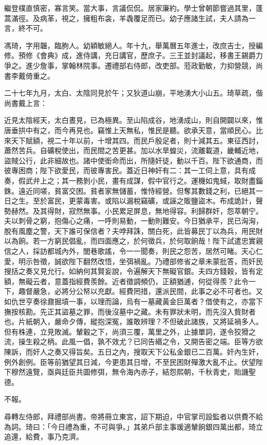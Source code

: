 \begin{pinyinscope}
{繼登樸直慎密，寡言笑。當大事，言議侃侃。居家廉約。學士曾朝節嘗過其里，蓬蒿滿徑。及病革，視之，擁粗布衾，羊毳覆足而已。幼子應諸生試，夫人請為一言，終不可。

馮琦，字用韞，臨朐人。幼穎敏絕人。年十九，舉萬曆五年進士，改庶吉士，授編修。預修《會典》成，進侍講，充日講官，歷庶子。三王並封議起，移書王錫爵力爭之。進少詹事，掌翰林院事。遷禮部右侍郎，改吏部。蒞政勤敏，力抑營競，尚書李戴倚重之。

二十七年九月，太白、太陰同見於午；又狄道山崩，平地湧大小山五。琦草疏，偕尚書戴上言：

近見太陰經天，太白晝見，已為極異。至山陷成谷，地湧成山，則自開闢以來，惟唐垂拱中有之，而今再見也。竊惟上天無私，惟民是聽。欲承天意，當順民心。比來天下賦額，視二十年以前，十增其四。而民戶殷足者，則十減其五。東征西討，蕭然苦兵。自礦稅使出，而民間之苦更甚。加以水旱蝗災，流離載道，畿輔近地，盜賊公行，此非細故也。諸中使銜命而出，所隨奸徒，動以千百。陛下欲通商，而彼專困商；陛下欲愛民，而彼專害民。蓋近日神奸有二：其一工伺上意，具有成奏，假武弁上之；其一務剝小民，畫有成謀，假中官行之。運機如鬼蜮，取財盡錙銖。遠近同嗟，貧富交困。貧者家無儲蓄，惟恃經營。但奪其數錢之利，已絕其一日之生。至於富民，更蒙毒害。或陷以漏稅竊礦，或誣之販鹽盜木。布成詭計，聲勢赫然。及其得財，寂然無事。小民累足屏息，無地得容。利歸群奸，怨萃朝宁。夫以刺骨之窮，抱傷心之痛，一呼則易動，一動則難安。今日猶承平，民已洶洶，脫有風塵之警，天下誰可保信者？夫哱拜誅，關白死，此皆募民丁以為兵，用民財以為餉。若一方窮民倡亂，而四面應之，於何徵兵，於何取餉哉！陛下試遣忠實親信之人，採訪都城內外，閭巷歌謠，令一一聞奏，則民之怨苦，居然可睹。天心仁愛，明示咎徵，誠欲陛下翻然改悟，坐弭禍亂。乃禮部修省之章未蒙批答，而奸民搜括之奏又見允行。如納何其賢妄說，令遍解天下無礙官銀。夫四方錢穀，皆有定額，無礙云者，意蓋指經費羨餘。近者徵調頻仍，正額猶逋，何從得羨？此令一下，趣督嚴急，必將分公帑以充獻。經費罔措，還派民間，此事之必不可者也。又如仇世亨奏徐鼐掘墳一事，以理而論，烏有一墓藏黃金巨萬者？借使有之，亦當下撫按核勘。先正其盜墓之罪，而後沒墓中之藏。未有罪狀未明，而先沒入貲財者也。片紙朝入，嚴命夕傳，縱抱深冤，誰敢辨理？不但破此諸族，又將延禍多人。但有株連，立見敗滅。輦轂之下，尚須三覆，萬里之外，止據單詞，遂令狡猾之流，操生殺之柄。此風一倡，孰不效尤？已同告緡之令，又開告密之端。臣等方欲陳訴，而奸人之奏又得旨矣。五日之內，搜取天下公私金銀已二百萬。奸內生奸，例外創例。臣等前猶望其日減，今更患其日增，不至民困財殫激大亂不止。伏望陛下穆然遠覽，亟與廷臣共圖修弭，無令海內赤子，結怨熙朝，千秋青史，貽譏聖德。

不報。

尋轉左侍郎，拜禮部尚書。帝將冊立東宮，詔下期迫，中官掌司設監者以供費不給為詞。琦曰：「今日禮為重，不可與爭。」其弟戶部主事瑗適輦餉銀四萬出都，琦立追還，給費，事乃克濟。

}
\end{pinyinscope}

